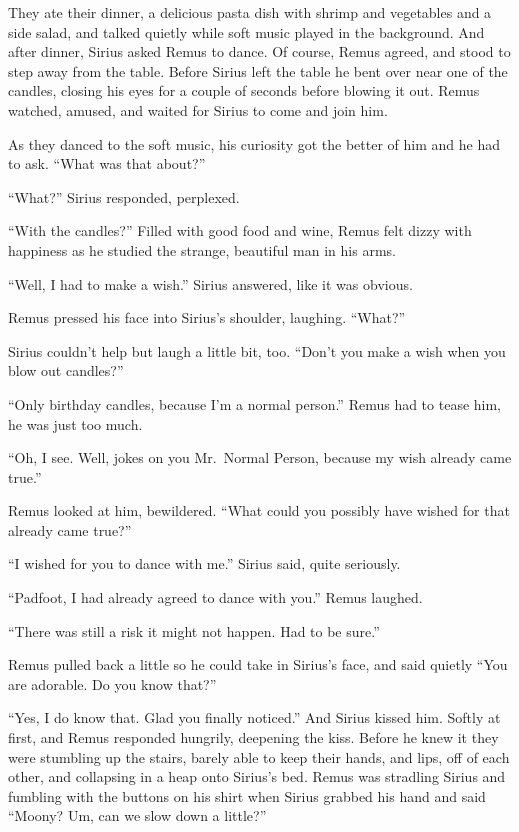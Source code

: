 \documentclass[12pt,twoside,openright]{memoir}
\begin{document}
They ate their dinner, a delicious pasta dish with shrimp and vegetables and a side salad, and talked quietly while soft music played in the background. And after dinner, Sirius asked Remus to dance. Of course, Remus agreed, and stood to step away from the table. Before Sirius left the table he bent over near one of the candles, closing his eyes for a couple of seconds before blowing it out. Remus watched, amused, and waited for Sirius to come and join him.

As they danced to the soft music, his curiosity got the better of him and he had to ask. ``What was that about?''

``What?'' Sirius responded, perplexed.

``With the candles?'' Filled with good food and wine, Remus felt dizzy with happiness as he studied the strange, beautiful man in his arms.

``Well, I had to make a wish.'' Sirius answered, like it was obvious.

Remus pressed his face into Sirius's shoulder, laughing. ``What?'' 

Sirius couldn't help but laugh a little bit, too. ``Don't you make a wish when you blow out candles?''

``Only birthday candles, because I'm a normal person.'' Remus had to tease him, he was just too much.

``Oh, I see. Well, jokes on you Mr.\ Normal Person, because my wish already came true.''

Remus looked at him, bewildered. ``What could you possibly have wished for that already came true?''

``I wished for you to dance with me.'' Sirius said, quite seriously. 

``Padfoot, I had already agreed to dance with you.'' Remus laughed.

``There was still a risk it might not happen. Had to be sure.''

Remus pulled back a little so he could take in Sirius's face, and said quietly ``You are adorable. Do you know that?''

``Yes, I do know that. Glad you finally noticed.'' And Sirius kissed him. Softly at first, and Remus responded hungrily, deepening the kiss. Before he knew it they were stumbling up the stairs, barely able to keep their hands, and lips, off of each other, and collapsing in a heap onto Sirius's bed. Remus was stradling Sirius and fumbling with the buttons on his shirt when Sirius grabbed his hand and said ``Moony? Um, can we slow down a little?''
\end{document}
